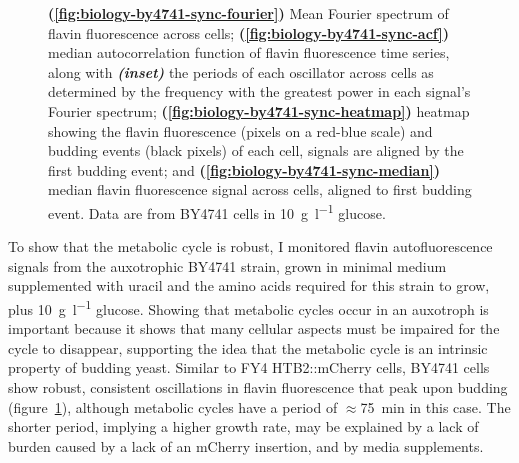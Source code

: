 \begin{figure}
  \caption{
    \textbf{(\ref{fig:biology-by4741-sync-fourier})} Mean Fourier spectrum of flavin fluorescence across cells; \textbf{(\ref{fig:biology-by4741-sync-acf})} median autocorrelation function of flavin fluorescence time series, along with \textit{\textbf{(inset)}} the periods of each oscillator across cells as determined by the frequency with the greatest power in each signal's Fourier spectrum;
    \textbf{(\ref{fig:biology-by4741-sync-heatmap})}
    heatmap showing the flavin fluorescence (pixels on a red-blue scale) and budding events (black pixels) of each cell,
    signals are aligned by the first budding event; and
    \textbf{(\ref{fig:biology-by4741-sync-median})}
    median flavin fluorescence signal across cells, aligned to first budding event.
    Data are from BY4741 cells in \SI{10}{\gram~\litre^{-1}} glucose.
  }
  \label{fig:biology-by4741-sync}
\end{figure}

To show that the metabolic cycle is robust,
I monitored flavin autofluorescence signals from the auxotrophic BY4741 strain, grown in minimal medium supplemented with uracil and the amino acids required for this strain to grow, plus \SI{10}{\gram~\litre^{-1}} glucose.
Showing that metabolic cycles occur in an auxotroph is important because it shows that many cellular aspects must be impaired for the cycle to disappear, supporting the idea that the metabolic cycle is an intrinsic property of budding yeast.
Similar to FY4 HTB2::mCherry cells, BY4741 cells show robust, consistent oscillations in flavin fluorescence that peak upon budding (figure~\ref{fig:biology-by4741-sync}), although metabolic cycles have a period of $\approx$\SI{75}{\minute} in this case.
The shorter period, implying a higher growth rate, may be explained by a lack of burden caused by a lack of an mCherry insertion, and by media supplements.


